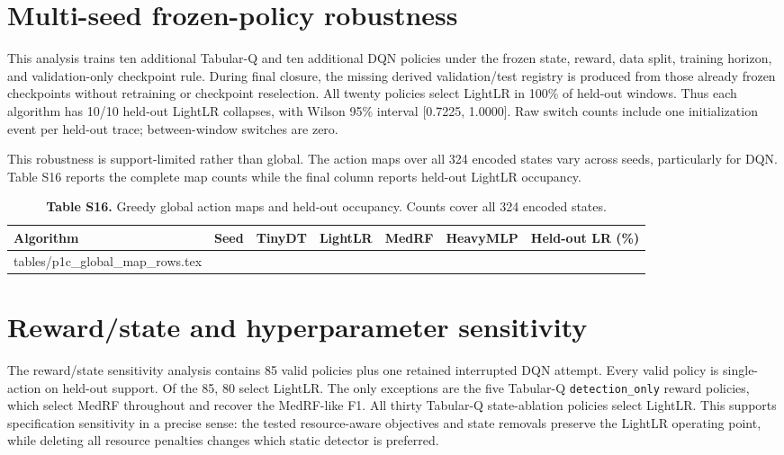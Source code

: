 \documentclass[10pt,a4paper]{article}
\makeatletter
\newcommand{\tableinput}[1]{\@@input #1.tex }
\makeatother
\begin{document}
\clearpage
\section{Multi-seed frozen-policy robustness}
This analysis trains ten additional Tabular-Q and ten additional DQN policies under the frozen state, reward, data split, training horizon, and validation-only checkpoint rule. During final closure, the missing derived validation/test registry is produced from those already frozen checkpoints without retraining or checkpoint reselection. All twenty policies select LightLR in 100\% of held-out windows. Thus each algorithm has 10/10 held-out LightLR collapses, with Wilson 95\% interval [0.7225, 1.0000]. Raw switch counts include one initialization event per held-out trace; between-window switches are zero.

This robustness is support-limited rather than global. The action maps over all 324 encoded states vary across seeds, particularly for DQN. Table S16 reports the complete map counts while the final column reports held-out LightLR occupancy.

\begin{table}[h!]
\centering\footnotesize
\caption*{\textbf{Table S16.} Greedy global action maps and held-out occupancy. Counts cover all 324 encoded states.}
\setlength{\tabcolsep}{3.3pt}
\begin{tabular}{lrrrrrr}\toprule
Algorithm & Seed & TinyDT & LightLR & MedRF & HeavyMLP & Held-out LR (\%)\\\midrule
\tableinput{tables/p1c_global_map_rows}
\bottomrule\end{tabular}
\end{table}

\clearpage
\section{Reward/state and hyperparameter sensitivity}
The reward/state sensitivity analysis contains 85 valid policies plus one retained interrupted DQN attempt. Every valid policy is single-action on held-out support. Of the 85, 80 select LightLR. The only exceptions are the five Tabular-Q \texttt{detection\_only} reward policies, which select MedRF throughout and recover the MedRF-like F1. All thirty Tabular-Q state-ablation policies select LightLR. This supports specification sensitivity in a precise sense: the tested resource-aware objectives and state removals preserve the LightLR operating point, while deleting all resource penalties changes which static detector is preferred.
\end{document}
